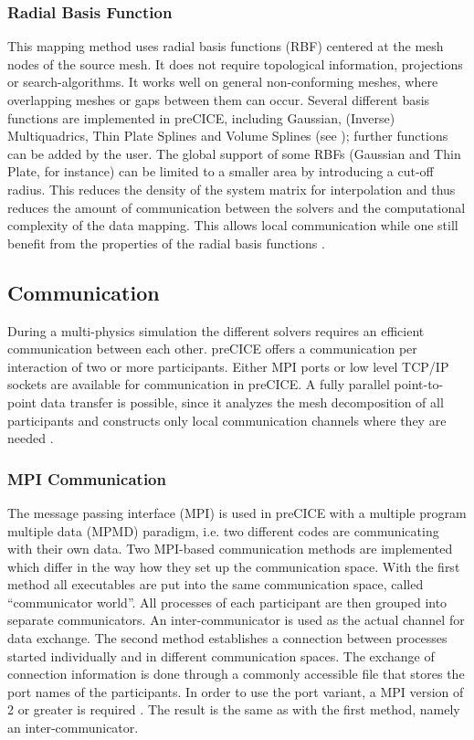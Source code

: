   \subsubsection{Radial Basis Function}\label{sec:Coupl-DataMapping-RBF}
   This mapping method uses radial basis functions (RBF) centered at the mesh nodes of the source mesh. It does not require topological information, projections or search-algorithms. It works well on general non-conforming meshes, where overlapping meshes or gaps between them can occur. Several different basis functions are implemented in preCICE, including Gaussian, (Inverse) Multiquadrics, Thin Plate Splines and Volume Splines (see \cite{bungartz2015fully}); further functions can be added by the user. The global support of some RBFs (Gaussian and Thin Plate, for instance) can be limited to a smaller area by introducing a cut-off radius. This reduces the density of the system matrix for interpolation and thus reduces the amount of communication between the solvers and the computational complexity of the data mapping. This allows local communication while one still benefit from the properties of the radial basis functions \cite{bungartz2015fully}.


 \subsection{Communication} \label{sec:Coupl-Communication}
  During a multi-physics simulation the different solvers requires an efficient communication between each other. preCICE offers a communication per interaction of two or more participants. Either MPI ports or low level TCP/IP sockets are available for communication in preCICE. A fully parallel point-to-point data transfer is possible, since it analyzes the mesh decomposition of all participants and constructs only local communication channels where they are needed \cite{bungartz2015fully}.
 
  \subsubsection{MPI Communication}\label{sec:Coupl-Communication-MPI}
   The message passing interface (MPI) is used in preCICE with a multiple program multiple data (MPMD) paradigm, i.e. two different codes are communicating with their own data. Two MPI-based communication methods are implemented which differ in the way how they set up the communication space. With the first method all executables are put into the same communication space, called ``communicator world''. All processes of each participant are then grouped into separate communicators. An inter-communicator is used as the actual channel for data exchange. The second method establishes a connection between processes started individually and in different communication spaces. The exchange of connection information is done through a commonly accessible file that stores the port names of the participants. In order to use the port variant, a MPI version of 2 or greater is required \cite{gatzhammer2015efficient}. The result is the same as with the first method, namely an inter-communicator.
   
